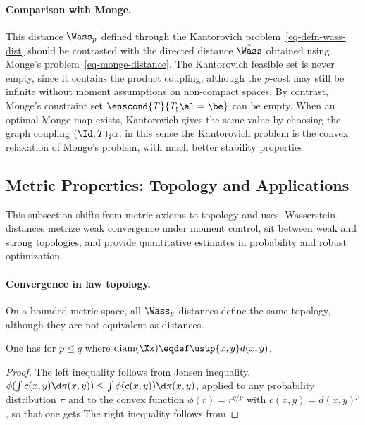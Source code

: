 \paragraph{Comparison with Monge.}

	This distance $\Wass_p$ defined through the Kantorovich problem~\eqref{eq-defn-wass-dist} should be contrasted with the directed distance $\tilde\Wass$ obtained using Monge's problem~\eqref{eq-monge-distance}. The Kantorovich feasible set is never empty, since it contains the product coupling, although the $p$-cost may still be infinite without moment assumptions on non-compact spaces. By contrast, Monge's constraint set $\enscond{T}{T_\sharp \al=\be}$ can be empty. When an optimal Monge map exists, Kantorovich gives the same value by choosing the graph coupling $(\Id,T)_\sharp\alpha$; in this sense the Kantorovich problem is the convex relaxation of Monge's problem, with much better stability properties.


\subsection{Metric Properties: Topology and Applications}

This subsection shifts from metric axioms to topology and uses. Wasserstein distances metrize weak convergence under moment control, sit between weak and strong topologies, and provide quantitative estimates in probability and robust optimization.

\paragraph{Convergence in law topology.}

On a bounded metric space, all $\Wass_p$ distances define the same topology, although they are not equivalent as distances.

\begin{prop}\label{prop-comp-wass-p}
	One has for $p \leq q$
	where $\text{\upshape diam}(\Xx) \eqdef \usup{x,y} d(x,y)$.
\end{prop}
\begin{proof}
		The left inequality follows from Jensen inequality, $\phi(\int c(x,y) \d\pi(x,y)) \leq \int \phi(c(x,y)) \d\pi(x,y)$, applied to any probability distribution $\pi$ and to the convex function $\phi(r)=r^{q/p}$ with $c(x,y)=d(x,y)^p$, so that one gets
		The right inequality follows from
	\end{proof}

